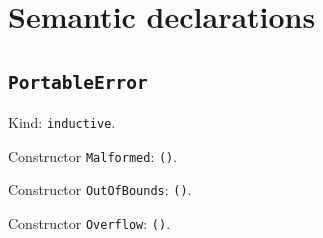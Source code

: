 \documentclass[11pt]{article}
\begin{document}
\section*{Semantic declarations}
\subsection*{\texttt{PortableError}}
\noindent Kind: \texttt{inductive}.\par
\noindent Constructor \texttt{Malformed}: \texttt{()}.\par
\noindent Constructor \texttt{OutOfBounds}: \texttt{()}.\par
\noindent Constructor \texttt{Overflow}: \texttt{()}.\par
\end{document}
